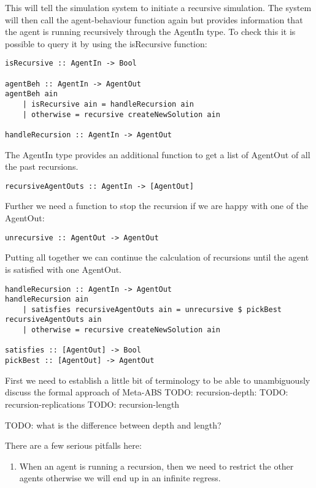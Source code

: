 This will tell the simulation system to initiate a recursive simulation. The system will then call the agent-behaviour function again but provides information that the agent is running recursively through the AgentIn type. To check this it is possible to query it by using the isRecursive function:

\begin{lstlisting}[frame=single]
isRecursive :: AgentIn -> Bool

agentBeh :: AgentIn -> AgentOut
agentBeh ain 
	| isRecursive ain = handleRecursion ain
	| otherwise = recursive createNewSolution ain
	
handleRecursion :: AgentIn -> AgentOut
\end{lstlisting}

The AgentIn type provides an additional function to get a list of AgentOut of all the past recursions. 

\begin{lstlisting}[frame=single]
recursiveAgentOuts :: AgentIn -> [AgentOut]
\end{lstlisting}

Further we need a function to stop the recursion if we are happy with one of the AgentOut:

\begin{lstlisting}[frame=single]
unrecursive :: AgentOut -> AgentOut
\end{lstlisting}

Putting all together we can continue the calculation of recursions until the agent is satisfied with one AgentOut. 

\begin{lstlisting}[frame=single]
handleRecursion :: AgentIn -> AgentOut
handleRecursion ain 
	| satisfies recursiveAgentOuts ain = unrecursive $ pickBest recursiveAgentOuts ain
	| otherwise = recursive createNewSolution ain

satisfies :: [AgentOut] -> Bool
pickBest :: [AgentOut] -> AgentOut
\end{lstlisting}

First we need to establish a little bit of terminology to be able to unambiguously discuss the formal approach of Meta-ABS
TODO: recursion-depth:
TODO: recursion-replications
TODO: recursion-length

TODO: what is the difference between depth and length?

There are a few serious pitfalls here: 
\begin{enumerate}
	\item When an agent is running a recursion, then we need to restrict the other agents otherwise we will end up in an infinite regress.
\end{enumerate}
	

